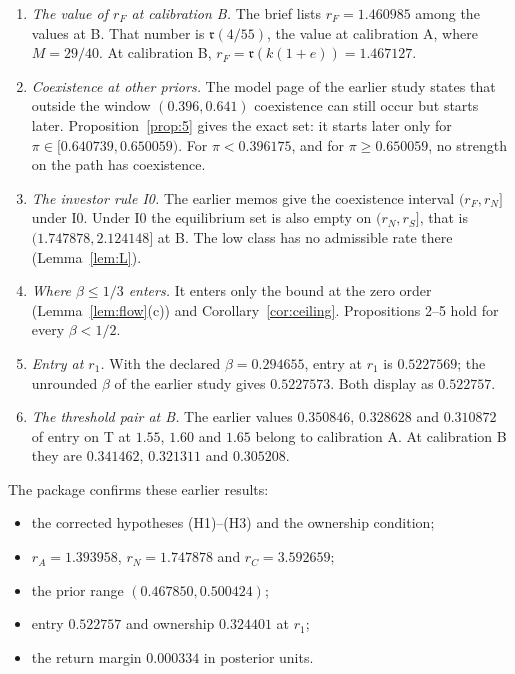 \documentclass[11pt]{article}
\theoremstyle{definition}
\newcommand{\fr}{\mathfrak r}
\begin{document}
\begin{enumerate}
\item \emph{The value of $r_F$ at calibration B.} The brief lists $r_F=1.460985$ among the values at B. That number
  is $\fr(4/55)$, the value at calibration A, where $M=29/40$. At calibration B,
  $r_F=\fr(k(1+e))=1.467127$.
\item \emph{Coexistence at other priors.} The model page of the earlier study states that outside the window
  $(0.396,0.641)$ coexistence can still occur but starts later. Proposition~\ref{prop:5} gives the exact set: it
  starts later only for $\pi\in[0.640739,0.650059)$. For $\pi<0.396175$, and for $\pi\ge0.650059$, no
  strength on the path has coexistence.
\item \emph{The investor rule I0.} The earlier memos give the coexistence interval $(r_F,r_N]$ under I0. Under I0
  the equilibrium set is also empty on $(r_N,r_S]$, that is $(1.747878,2.124148]$ at B. The low class has no
  admissible rate there (Lemma~\ref{lem:L}).
\item \emph{Where $\beta\le1/3$ enters.} It enters only the bound at the zero order (Lemma~\ref{lem:flow}(c)) and
  Corollary~\ref{cor:ceiling}. Propositions 2--5 hold for every $\beta<1/2$.
\item \emph{Entry at $r_1$.} With the declared $\beta=0.294655$, entry at $r_1$ is $0.5227569$; the unrounded
  $\beta$ of the earlier study gives $0.5227573$. Both display as $0.522757$.
\item \emph{The threshold pair at B.} The earlier values $0.350846$, $0.328628$ and $0.310872$ of entry on T at
  $1.55$, $1.60$ and $1.65$ belong to calibration A. At calibration B they are $0.341462$, $0.321311$ and $0.305208$.
\end{enumerate}
The package confirms these earlier results:
\begin{itemize}
\item the corrected hypotheses (H1)--(H3) and the ownership condition;
\item $r_A=1.393958$, $r_N=1.747878$ and $r_C=3.592659$;
\item the prior range $(0.467850,0.500424)$;
\item entry $0.522757$ and ownership $0.324401$ at $r_1$;
\item the return margin $0.000334$ in posterior units.
\end{itemize}
\end{document}

